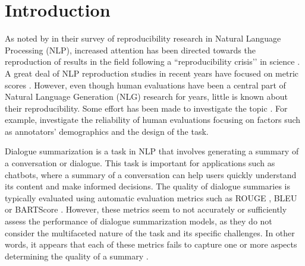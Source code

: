 
\section{Introduction}

As noted by \citet{reproducibility_in_nlp} in their survey of reproducibility research in Natural Language Processing (NLP), increased attention has been directed towards the reproduction of results in the field following a ``reproducibility crisis’’ in science \cite{baker2016reproducibility}. A great deal of NLP reproduction studies in recent years have focused on metric scores \cite{belz-etal-2021-reprogen}. However, even though human evaluations have been a central part of Natural Language Generation (NLG) research for years, little is known about their reproducibility. Some effort has been made to investigate the topic \cite{gehrmann2022repairing}. For example, \citet{iskender-etal-2021-reliability} investigate the reliability of human evaluations focusing on factors such as annotators’ demographics and the design of the task. 

Dialogue summarization is a task in NLP that involves generating a summary of a conversation or dialogue. This task is important for applications such as chatbots, where a summary of a conversation can help users quickly understand its content and make informed decisions. The quality of dialogue summaries is typically evaluated using automatic evaluation metrics such as ROUGE \cite{lin2004rouge}, BLEU \cite{papineni2002bleu} or BARTScore \cite{yuan-etal-2021-bartscore}. However, these metrics seem to not accurately or sufficiently assess the performance of dialogue summarization models, as they do not consider the multifaceted nature of the task and  its  specific challenges. In other words, it appears that each of these metrics fails to capture one or more aspects determining the quality of a summary \cite{deutsch-roth-2021-understanding}.


